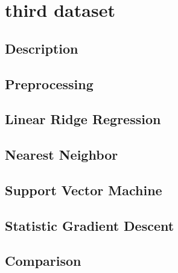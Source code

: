 \section{third dataset}
\subsection{Description}
\subsection{Preprocessing}
\subsection{Linear Ridge Regression}
\subsection{Nearest Neighbor}
\subsection{Support Vector Machine}
\subsection{Statistic Gradient Descent}
\subsection{Comparison}
